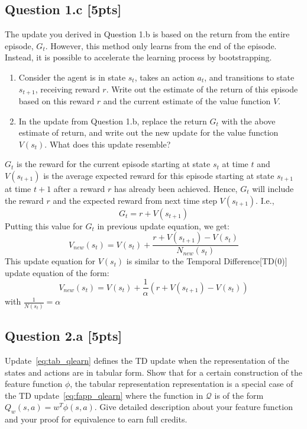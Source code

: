 \documentclass[12pt]{article}
\begin{document}
\pagebreak[4]

\subsection*{Question 1.c \textbf{[5pts]}}
The update you derived in Question 1.b is based on the return from the entire episode, $G_t$. However, this method only learns from the end of the episode. Instead, it is possible to accelerate the learning process by bootstrapping. 

\begin{enumerate}
    \item Consider the agent is in state $s_t$, takes an action $a_t$, and transitions to state $s_{t+1}$, receiving reward $r$. Write out the estimate of the return of this episode based on this reward $r$ and the current estimate of the value function $V$. 
    \item In the update from Question 1.b, replace the return $G_t$ with the above estimate of return, and write out the new update for the value function $V(s_t)$. What does this update resemble?
\end{enumerate}

\noindent
\begin{solution}
$G_t$ is the reward for the current episode starting at state $s_t$ at time $t$ and $V(s_{t+1})$ is the average expected reward for this episode starting at state $s_{t+1}$ at time $t+1$ after a reward $r$ has already been achieved. Hence, $G_t$ will include the reward $r$ and the expected reward from next time step $V(s_{t+1})$. I.e.,
$$G_t = r + V(s_{t+1})$$
Putting this value for $G_t$ in previous update equation, we get:
$$V_{new}(s_t) = V(s_t) + \frac{r + V(s_{t+1}) - V(s_t)}{N_{new}(s_t)}$$
This update equation for $V(s_t)$ is similar to the Temporal Difference[TD(0)] update equation of the form:
$$V_{new}(s_t) = V(s_t) + \frac{1}{\alpha}(r + V(s_{t+1}) - V(s_t))$$
with $\frac{1}{N(s_t)} = \alpha$
\end{solution}

\pagebreak[4]

\subsection*{Question 2.a \textbf{[5pts]}}
Update~\ref{eq:tab_qlearn} defines the TD update when the representation of the states and actions are in tabular form. Show that for a certain construction of the feature function $\phi$, the tabular representation representation is a special case of the TD update~\ref{eq:fapp_qlearn} where the function in $\mathcal Q$ is of the form $Q _w(s, a) = w ^T \phi(s, a)$. Give detailed description about your feature function and your proof for equivalence to earn full credits. \\
\end{document}
